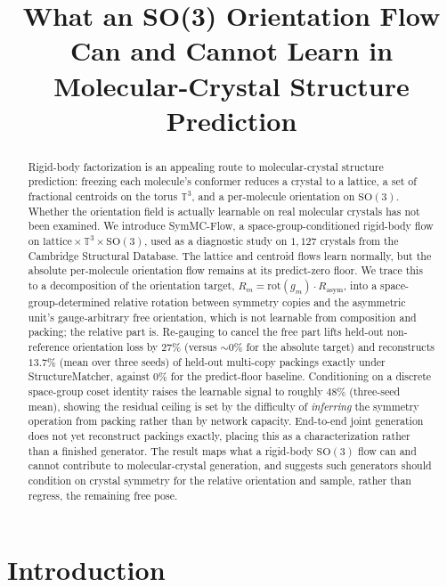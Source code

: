 \documentclass[10pt]{article}
\title{What an SO(3) Orientation Flow Can and Cannot Learn in\\
Molecular-Crystal Structure Prediction}
\author{}   %
\begin{document}
\maketitle

\begin{abstract}
Rigid-body factorization is an appealing route to molecular-crystal structure
prediction: freezing each molecule's conformer reduces a crystal to a lattice,
a set of fractional centroids on the torus $\mathbb{T}^3$, and a per-molecule
orientation on $\mathrm{SO}(3)$. Whether the orientation field is actually
learnable on real molecular crystals has not been examined. We introduce
SymMC-Flow, a space-group-conditioned rigid-body flow on
$\text{lattice}\times\mathbb{T}^3\times\mathrm{SO}(3)$, used as a diagnostic
study on $1{,}127$ crystals from the Cambridge Structural Database. The
lattice and centroid flows learn normally, but the absolute per-molecule
orientation flow remains at its predict-zero floor. We trace this to a
decomposition of the orientation target,
$R_m = \mathrm{rot}(g_m)\cdot R_{\text{asym}}$, into a space-group-determined
relative rotation between symmetry copies and the asymmetric unit's
gauge-arbitrary free orientation, which is not learnable from composition and
packing; the relative part is. Re-gauging to cancel the free part lifts
held-out non-reference orientation loss by $27\%$ (versus $\sim\!0\%$ for the
absolute target) and reconstructs $13.7\%$ (mean over three seeds) of
held-out multi-copy packings exactly under StructureMatcher, against $0\%$
for the predict-floor baseline. Conditioning on a discrete space-group coset
identity raises the learnable signal to roughly $48\%$ (three-seed mean),
showing the residual ceiling is set by the difficulty of \emph{inferring}
the symmetry operation from packing rather than by network capacity.
End-to-end joint generation does not yet reconstruct packings exactly,
placing this as a characterization rather than a finished generator. The
result maps what a rigid-body $\mathrm{SO}(3)$ flow can and cannot
contribute to molecular-crystal generation, and suggests such generators
should condition on crystal symmetry for the relative orientation and
sample, rather than regress, the remaining free pose.
\end{abstract}

\section{Introduction}
\end{document}

